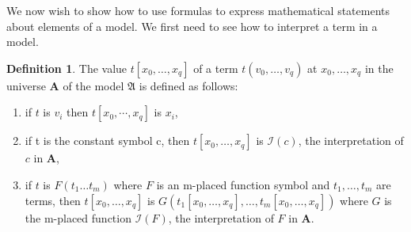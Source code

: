 \documentclass[titlepage, oneside]{amsbook}
\theoremstyle{plain}
\theoremstyle{definition}
\newtheorem{definition}{Definition}
\theoremstyle{remark}
\newcommand{\ba}{\ensuremath{\mathbf{A}}}
\begin{document}
We now wish to show how to use formulas to express mathematical statements
about elements of a model.  We first need to see how to interpret a term
in a model.  


\begin{definition}
%
The value $t[x_{0}, \dots ,x_{q}]$ of a term 
$t(v_{0}, \dots , v_{q})$ at $x_{0}, \dots , x_{q}$ in the 
universe $\ba$ of the model 
$\mathfrak{A}$ is defined as follows:


\begin{enumerate}
\item if $t$ is $v_{i}$ then $t[x_{0}, \cdots , x_{q}]$ is $x_{i}$,
\item if t is the constant symbol c, then $t[x_{0}, \dots , x_{q}] $ is
$\mathcal{I}(c)$,
  the interpretation of $c$ in $\mathbf{A}$,
\item if $t$ is $F(t_{1} \dots  t_{m})$ where $F$ is an m-placed 
function symbol and $t_{1}, \dots ,t_{m}$ are terms, then $t[x_{0}, \dots 
, x_{q}]$ is $G(t_{1}[x_{0}, \dots ,x_{q}], \dots , t_{m}[x_{0}, \dots
,x_{q}])$
where $G $ is the m-placed function $ \mathcal{I}(F)$, the
interpretation 
of $F$ in $\mathbf{A}$.
 

\end{enumerate}

\end{definition}
\end{document}

